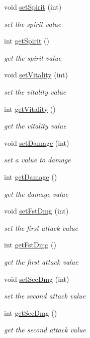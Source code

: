 \begin{DoxyCompactItemize}
void \hyperlink{classMonster_a70ed94bbad22eec5ef9dc457933b1271}{set\+Spirit} (int)
\begin{DoxyCompactList}\small\item\em set the spirit value \end{DoxyCompactList}\item 
int \hyperlink{classMonster_a43910f57b03ba87c62def418d994d8c8}{get\+Spirit} ()
\begin{DoxyCompactList}\small\item\em get the spirit value \end{DoxyCompactList}\item 
void \hyperlink{classMonster_a2844a2ffd8dee9fc331504170c1acede}{set\+Vitality} (int)
\begin{DoxyCompactList}\small\item\em set the vitality value \end{DoxyCompactList}\item 
int \hyperlink{classMonster_a899fe1373b54dc3613f98ff570bb01bf}{get\+Vitality} ()
\begin{DoxyCompactList}\small\item\em get the vitality value \end{DoxyCompactList}\item 
void \hyperlink{classMonster_a8fc54b4bbd71e76d0f2d79d88bf855f9}{set\+Damage} (int)
\begin{DoxyCompactList}\small\item\em set a value to damage \end{DoxyCompactList}\item 
int \hyperlink{classMonster_ae09da3617912fcab5fc661be5f2c77c5}{get\+Damage} ()
\begin{DoxyCompactList}\small\item\em get the damage value \end{DoxyCompactList}\item 
void \hyperlink{classMonster_a9413a198ea61970626bbe059917feaca}{set\+Fst\+Dmg} (int)
\begin{DoxyCompactList}\small\item\em set the first attack value \end{DoxyCompactList}\item 
int \hyperlink{classMonster_aac4feaf0b40de54dbd5a93e168cc8163}{get\+Fst\+Dmg} ()
\begin{DoxyCompactList}\small\item\em get the first attack value \end{DoxyCompactList}\item 
void \hyperlink{classMonster_aab2ca4d9b1d0d4f5c9a0dee64b063c37}{set\+Sec\+Dmg} (int)
\begin{DoxyCompactList}\small\item\em set the second attack value \end{DoxyCompactList}\item 
int \hyperlink{classMonster_a1d4ee87d8f6f564709859039928cb50a}{get\+Sec\+Dmg} ()
\begin{DoxyCompactList}\small\item\em get the second attack value \end{DoxyCompactList}\end{DoxyCompactItemize}
